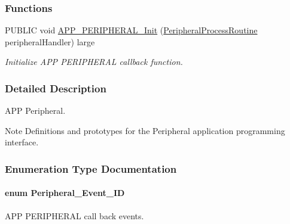 \subsubsection*{Functions}
\begin{DoxyCompactItemize}
\item 
P\+U\+B\+L\+IC void \hyperlink{group___a_p_p___p_e_r_i_p_h_e_r_a_l_ga24aa8b5f62a6dd8a5327d10fce2280d0}{A\+P\+P\+\_\+\+P\+E\+R\+I\+P\+H\+E\+R\+A\+L\+\_\+\+Init} (\hyperlink{group___a_p_p___p_e_r_i_p_h_e_r_a_l_ga2d5e3f5799fd99d38b333c322c4fa536}{Peripheral\+Process\+Routine} peripheral\+Handler) large
\begin{DoxyCompactList}\small\item\em Initialize A\+PP P\+E\+R\+I\+P\+H\+E\+R\+AL callback function. \end{DoxyCompactList}\end{DoxyCompactItemize}


\subsubsection{Detailed Description}
A\+PP Peripheral. 

\begin{DoxyNote}{Note}
Definitions and prototypes for the Peripheral application programming interface. 
\end{DoxyNote}


\subsubsection{Enumeration Type Documentation}
\paragraph[{\texorpdfstring{Peripheral\+\_\+\+Event\+\_\+\+ID}{Peripheral_Event_ID}}]{\setlength{\rightskip}{0pt plus 5cm}enum {\bf Peripheral\+\_\+\+Event\+\_\+\+ID}}\hypertarget{group___a_p_p___p_e_r_i_p_h_e_r_a_l_ga0bafa1da04bd0103ec3e3f4ef8316d2e}{}\label{group___a_p_p___p_e_r_i_p_h_e_r_a_l_ga0bafa1da04bd0103ec3e3f4ef8316d2e}


A\+PP P\+E\+R\+I\+P\+H\+E\+R\+AL call back events. 


